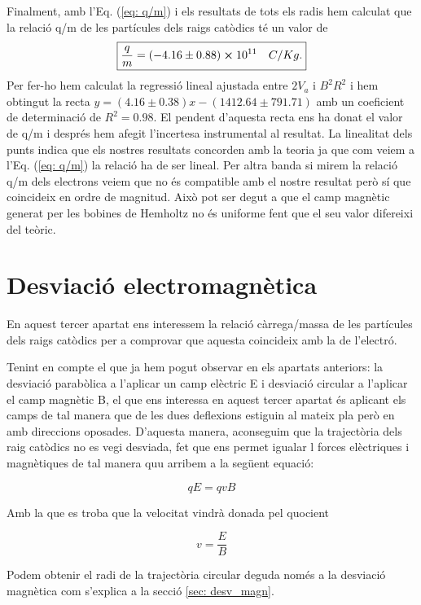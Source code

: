 \documentclass[11pt]{article}
\begin{document}
Finalment, amb l'Eq. (\ref{eq: q/m}) i els resultats de tots els radis hem calculat que la relació q/m de les partícules dels raigs catòdics té un valor de 
\[
\boxed{\frac{q}{m}=(-4.16\pm0.88)\cross10^{11}\quad C/Kg.}
\]
Per fer-ho hem calculat la regressió lineal ajustada entre $2V_a$ i $B^2R^2$ i hem obtingut la recta $y=(4.16\pm0.38)x - (1412.64\pm791.71)$ amb un coeficient de determinació de $R^2=0.98$. El pendent d'aquesta recta ens ha donat el valor de q/m i després hem afegit l'incertesa instrumental al resultat. La linealitat dels punts indica que els nostres resultats concorden amb la teoria ja que com veiem a l'Eq. (\ref{eq: q/m}) la relació ha de ser lineal. Per altra banda si mirem la relació q/m dels electrons veiem que no és compatible amb el nostre resultat però sí que coincideix en ordre de magnitud. Això pot ser degut a que el camp magnètic generat per les bobines de Hemholtz no és uniforme fent que el seu valor difereixi del teòric.


\section{Desviació electromagnètica}\label{sec: desv_em}

En aquest tercer apartat ens interessem la relació càrrega/massa de les partícules dels raigs catòdics per a comprovar que aquesta coincideix amb la de l'electró. 

Tenint en compte el que ja hem pogut observar en els apartats anteriors: la desviació parabòlica a l'aplicar un camp elèctric E i desviació circular a l'aplicar el camp magnètic B, el que ens interessa en aquest tercer apartat és aplicant els camps de tal manera que de les dues deflexions estiguin al mateix pla però en amb direccions oposades. D'aquesta manera, aconseguim que la trajectòria dels raig catòdics no es vegi desviada, fet que ens permet igualar l forces elèctriques i magnètiques de tal manera quu arribem a la següent equació:

\begin{equation}\label{eq: Fm=Fe}
    qE = qvB
\end{equation}

Amb la que es troba que la velocitat vindrà donada pel quocient

\begin{equation}
    v = \frac{E}{B}
\end{equation}

Podem obtenir el radi de la trajectòria circular deguda només a la desviació magnètica com s'explica a la secció \ref{sec: desv_magn}.
\end{document}
